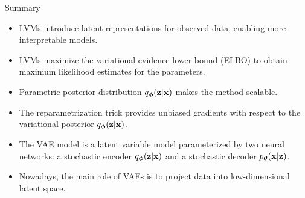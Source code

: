 \documentclass{beamer}
\begin{document}
\begin{frame}{Summary}
	\begin{itemize}
		\item LVMs introduce latent representations for observed data, enabling more interpretable models.
		\vfill
		\item LVMs maximize the variational evidence lower bound (ELBO) to obtain maximum likelihood estimates for the parameters.
		\vfill
		\item Parametric posterior distribution $q_{\boldsymbol{\phi}}(\mathbf{z}| \mathbf{x})$ makes the method scalable.
		\vfill
		\item The reparametrization trick provides unbiased gradients with respect to the variational posterior $q_{\boldsymbol{\phi}}(\mathbf{z}| \mathbf{x})$.
		\vfill
		\item The VAE model is a latent variable model parameterized by two neural networks: a stochastic encoder $q_{\boldsymbol{\phi}}(\mathbf{z}| \mathbf{x})$ and a stochastic decoder $p_{\boldsymbol{\theta}}(\mathbf{x} | \mathbf{z})$.
		\vfill
		\item Nowadays, the main role of VAEs is to project data into low-dimensional latent space.
	\end{itemize}
\end{frame}
\end{document}
